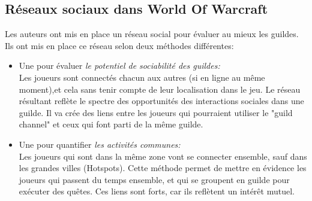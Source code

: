\documentclass[10pt,twocolumn]{article}
\begin{document}
\subsection{Réseaux sociaux dans World Of Warcraft} 
Les auteurs ont mis en place un réseau social pour évaluer au mieux les guildes. Ils ont mis en place ce réseau selon deux méthodes différentes:
\begin{itemize}
	\renewcommand{\labelitemi}{$\bullet$}
	\item Une pour évaluer \textit{le potentiel de sociabilité des guildes:}\\
	Les joueurs sont connectés chacun aux autres (si en ligne au même moment),et cela sans tenir compte de leur localisation dans le jeu. Le réseau résultant reflète le spectre des opportunités des interactions sociales dans une guilde. Il va crée des liens entre les joueurs qui pourraient utiliser le "guild channel" et ceux qui font parti de la même guilde.
	\item Une pour quantifier \textit{les activités communes:}\\
	Les joueurs qui sont dans la même zone vont se connecter ensemble, sauf dans les grandes villes (Hotspots). Cette méthode permet de mettre en évidence les joueurs qui passent du temps ensemble, et qui se groupent en guilde pour exécuter des quêtes. Ces liens sont forts, car ils reflètent un intérêt mutuel. 
\end{itemize}
\end{document}
